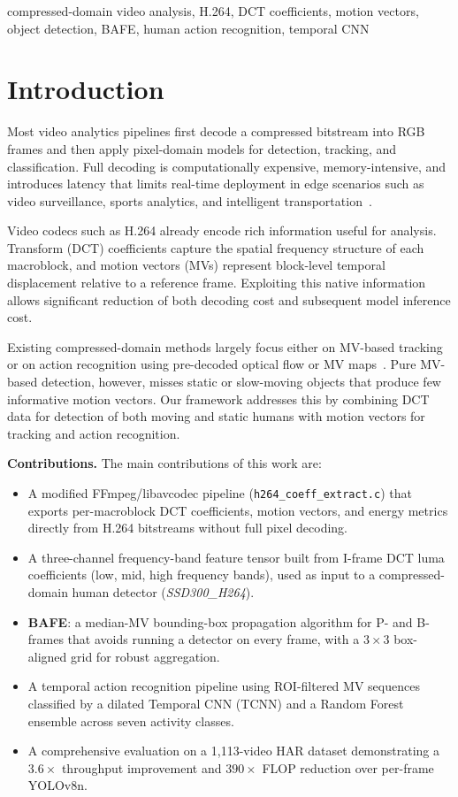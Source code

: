 \documentclass[conference]{IEEEtran}
\begin{document}
\begin{IEEEkeywords}
compressed-domain video analysis, H.264, DCT coefficients, motion vectors, object detection, BAFE, human action recognition, temporal CNN
\end{IEEEkeywords}

\section{Introduction}

Most video analytics pipelines first decode a compressed bitstream into RGB frames and then apply pixel-domain models for detection, tracking, and classification. Full decoding is computationally expensive, memory-intensive, and introduces latency that limits real-time deployment in edge scenarios such as video surveillance, sports analytics, and intelligent transportation~\cite{wang2019fast,wu2020mimic}.

Video codecs such as H.264 already encode rich information useful for analysis. Transform (DCT) coefficients capture the spatial frequency structure of each macroblock, and motion vectors (MVs) represent block-level temporal displacement relative to a reference frame. Exploiting this native information allows significant reduction of both decoding cost and subsequent model inference cost.

Existing compressed-domain methods largely focus either on MV-based tracking~\cite{duche2026see} or on action recognition using pre-decoded optical flow or MV maps~\cite{wu2020mimic,shahabinejad2024adaptive}. Pure MV-based detection, however, misses static or slow-moving objects that produce few informative motion vectors. Our framework addresses this by combining DCT data for detection of both moving and static humans with motion vectors for tracking and action recognition.

\textbf{Contributions.} The main contributions of this work are:
\begin{itemize}
  \item A modified FFmpeg/libavcodec pipeline (\texttt{h264\_coeff\_extract.c}) that exports per-macroblock DCT coefficients, motion vectors, and energy metrics directly from H.264 bitstreams without full pixel decoding.
  \item A three-channel frequency-band feature tensor built from I-frame DCT luma coefficients (low, mid, high frequency bands), used as input to a compressed-domain human detector (\emph{SSD300\_H264}).
  \item \textbf{BAFE}: a median-MV bounding-box propagation algorithm for P- and B-frames that avoids running a detector on every frame, with a $3\!\times\!3$ box-aligned grid for robust aggregation.
  \item A temporal action recognition pipeline using ROI-filtered MV sequences classified by a dilated Temporal CNN (TCNN) and a Random Forest ensemble across seven activity classes.
  \item A comprehensive evaluation on a 1{,}113-video HAR dataset demonstrating a $3.6\!\times$ throughput improvement and $390\!\times$ FLOP reduction over per-frame YOLOv8n.
\end{itemize}
\end{document}
